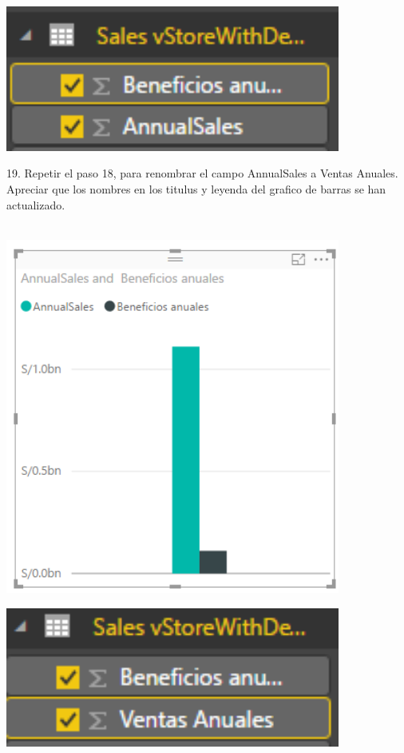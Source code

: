 \documentclass[12pt,letterpaper]{article}
\begin{document}
\begin{center}
\includegraphics[width=11cm]{IMG/35.png} 
\end{center}
19. Repetir el paso 18, para renombrar el campo AnnualSales a Ventas Anuales. Apreciar que los nombres en
los titulus y leyenda del grafico de barras se han actualizado.\\\\
\begin{center}
\includegraphics[width=11cm]{IMG/36.png} 
\end{center}
\begin{center}
\includegraphics[width=11cm]{IMG/37.png} 
\end{center}
\end{document}
